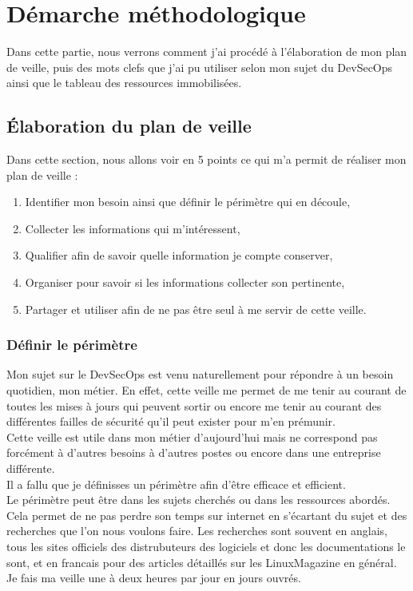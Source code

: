\documentclass[11pt,a4paper,oneside]{book}
\begin{document}
\chapter{Démarche méthodologique}

Dans cette partie, nous verrons comment j'ai procédé à l'élaboration de mon plan de veille, puis des mots clefs que j'ai pu utiliser selon mon sujet du DevSecOps ainsi que le tableau des ressources immobilisées.

\section{Élaboration du plan de veille}

Dans cette section, nous allons voir en 5 points ce qui m'a permit de réaliser mon plan de veille :
\begin{enumerate}
\item Identifier mon besoin ainsi que définir le périmètre qui en découle,
\item Collecter les informations qui m'intéressent,
\item Qualifier afin de savoir quelle information je compte conserver,
\item Organiser pour savoir si les informations collecter son pertinente,
\item Partager et utiliser afin de ne pas être seul à me servir de cette veille.
\end{enumerate}


\subsection{Définir le périmètre}

Mon sujet sur le DevSecOps est venu naturellement pour répondre à un besoin quotidien, mon métier.
En effet, cette veille me permet de me tenir au courant de toutes les mises à jours qui peuvent sortir ou encore me tenir au courant des différentes failles de sécurité qu'il peut exister pour m'en prémunir. \\
Cette veille est utile dans mon métier d'aujourd'hui mais ne correspond pas forcément à d'autres besoins à d'autres postes ou encore dans une entreprise différente. \\
Il a fallu que je définisses un périmètre afin d'être efficace et efficient. \\
Le périmètre peut être dans les sujets cherchés ou dans les ressources abordés.
Cela permet de ne pas perdre son temps sur internet en s'écartant du sujet et des recherches que l'on nous voulons faire. 
Les recherches sont souvent en anglais, tous les sites officiels des distrubuteurs des logiciels et donc les documentations le sont, et en francais pour des articles détaillés sur les LinuxMagazine en général. \\
Je fais ma veille une à deux heures par jour en jours ouvrés.
\end{document}
